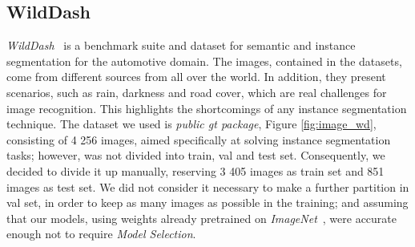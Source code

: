 \documentclass[10pt,twocolumn,letterpaper]{article}
\begin{document}
\subsection{WildDash}
\label{dataset_wd}
\textit{WildDash}~\cite{wildDash} is a benchmark suite and dataset for semantic and instance segmentation for the automotive domain. The images, contained in the datasets, come from different sources from all over the world. In addition, they present scenarios, such as rain, darkness and road cover, which are real challenges for image recognition. This highlights the shortcomings of any instance segmentation technique.
The dataset we used is \textit{public gt package}, Figure \ref{fig:image_wd}, consisting of 4 256 images, aimed specifically at solving instance segmentation tasks; however, was not divided into train, val and test set. Consequently, we decided to divide it up manually, reserving 3 405 images as train set and 851 images as test set. We did not consider it necessary to make a further partition in val set, in order to keep as many images as possible in the training; and assuming that our models, using weights already pretrained on \textit{ImageNet}~\cite{imagenet}, were accurate enough not to require \textit{Model Selection}.
\end{document}
